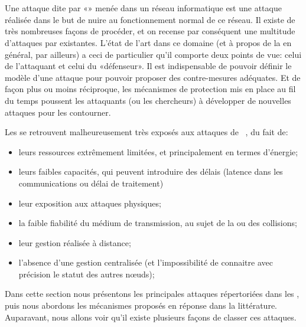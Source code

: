 \section{\Dds}\label{ea:sec:dos}

Une attaque dite par «\dds» menée dans un réseau informatique est une attaque réalisée dans le but de nuire au fonctionnement normal de ce réseau.
Il existe de très nombreuses façons de procéder, et on recense par conséquent une multitude d'attaques par \dds existantes.
L'état de l'art dans ce domaine (et à propos de la \secu en général, par ailleurs) a ceci de particulier qu'il comporte deux points de vue: celui de l'attaquant et celui du «défenseur».
Il est indispensable de pouvoir définir le modèle d'une attaque pour pouvoir proposer des contre-mesures adéquates.
Et de façon plus ou moins réciproque, les mécanismes de protection mis en place au fil du temps poussent les attaquants (ou les chercheurs) à développer de nouvelles attaques pour les contourner.

Les \rcs se retrouvent malheureusement très exposés aux attaques de \dds~\cite{RM11}, du fait de:
\begin{itemize}
    \item leurs ressources extrêmement limitées, et principalement en termes d'énergie;
    \item leurs faibles capacités, qui peuvent introduire des délais (latence dans les communications ou délai de traitement)
    \item leur exposition aux attaques physiques;
    \item la faible fiabilité du médium de transmission, au sujet de la  ou des collisions;
    \item leur gestion réalisée à distance;
    \item l'absence d'une gestion centralisée (et l'impossibilité de connaitre avec précision le statut des autres nœuds);
\end{itemize}

Dans cette section nous présentons les principales attaques répertoriées dans les \rcs, puis nous abordons les mécanismes proposés en réponse dans la littérature.
Auparavant, nous allons voir qu'il existe plusieurs façons de classer ces attaques.










